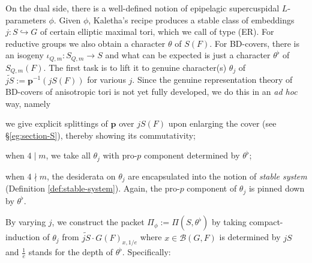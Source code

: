 \documentclass[a4paper,10pt]{article}
\begin{document}
On the dual side, there is a well-defined notion of epipelagic supercuspidal $L$-parameters $\phi$. Given $\phi$, Kaletha's recipe produces a stable class of embeddings $j: S \hookrightarrow G$ of certain elliptic maximal tori, which we call of type (ER). For reductive groups we also obtain a character $\theta$ of $S(F)$. For BD-covers, there is an isogeny $\iota_{Q,m}: S_{Q,m} \to S$ and what can be expected is just a character $\theta^\flat$ of $S_{Q,m}(F)$. The first task is to lift it to genuine character(s) $\theta_j$ of $\widetilde{jS} := \bm{p}^{-1}\left( jS(F) \right)$ for various $j$. Since the genuine representation theory of BD-covers of anisotropic tori is not yet fully developed, we do this in an \textit{ad hoc} way, namely
\begin{compactitem}
	\item we give explicit splittings of $\bm{p}$ over $jS(F)$ upon enlarging the cover (see \S\ref{eg:section-S}), thereby showing its commutativity;
	\item when $4 \mid m$, we take all $\theta_j$ with pro-$p$ component determined by $\theta^\flat$;
	\item when $4 \nmid m$, the desiderata on $\theta_j$ are encapsulated into the notion of \emph{stable system} (Definition \ref{def:stable-system}). Again, the pro-$p$ component of $\theta_j$ is pinned down by $\theta^\flat$.
\end{compactitem}
By varying $j$, we construct the packet $\Pi_\phi := \Pi(S, \theta^\flat)$ by taking compact-induction of $\theta_j$ from $\widetilde{jS} \cdot G(F)_{x, 1/e}$ where $x \in \mathcal{B}(G,F)$ is determined by $jS$ and $\frac{1}{e}$ stands for the depth of $\theta^\flat$. Specifically:
\end{document}
